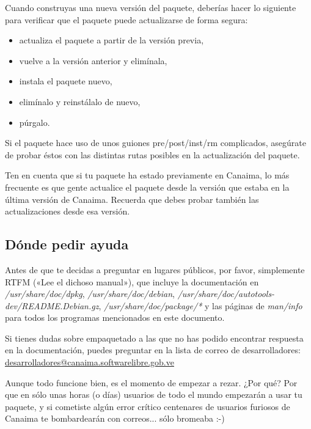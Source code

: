 \documentclass[letterpaper,12pt,spanish]{manual}
\begin{document}
Cuando construyas una nueva versión del paquete, deberías hacer lo siguiente para verificar que el paquete puede actualizarse de forma segura:
\begin{itemize}
\item {} 
actualiza el paquete a partir de la versión previa,

\item {} 
vuelve a la versión anterior y elimínala,

\item {} 
instala el paquete nuevo,

\item {} 
elimínalo y reinstálalo de nuevo,

\item {} 
púrgalo.

\end{itemize}

Si el paquete hace uso de unos guiones pre/post/inst/rm complicados, asegúrate de probar éstos con las distintas rutas posibles en la actualización del paquete.

Ten en cuenta que si tu paquete ha estado previamente en Canaima, lo más frecuente es que gente actualice el paquete desde la versión que estaba en la última versión de Canaima. Recuerda que debes probar también las actualizaciones desde esa versión.


\subsection{Dónde pedir ayuda}

Antes de que te decidas a preguntar en lugares públicos, por favor, simplemente RTFM («Lee el dichoso manual»), que incluye la documentación en \emph{/usr/share/doc/dpkg}, \emph{/usr/share/doc/debian}, \emph{/usr/share/doc/autotools-dev/README.Debian.gz}, \emph{/usr/share/doc/package/*} y las páginas de \emph{man/info} para todos los programas mencionados en este documento.

Si tienes dudas sobre empaquetado a las que no has podido encontrar respuesta en la documentación, puedes preguntar en la lista de correo de desarrolladores: \href{mailto:desarrolladores@canaima.softwarelibre.gob.ve}{desarrolladores@canaima.softwarelibre.gob.ve}

Aunque todo funcione bien, es el momento de empezar a rezar. ¿Por qué? Por que en sólo unas horas (o días) usuarios de todo el mundo empezarán a usar tu paquete, y si cometiste algún error crítico centenares de usuarios furiosos de Canaima te bombardearán con correos... sólo bromeaba :-)
\end{document}
